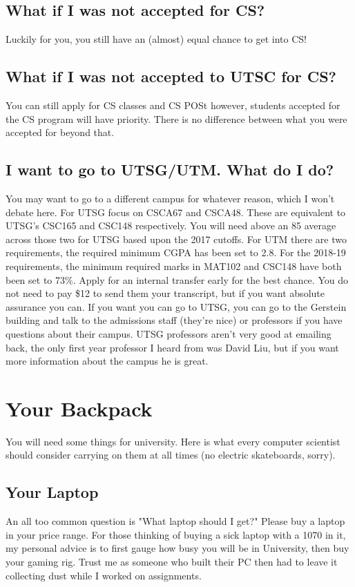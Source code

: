 \documentclass[11pt]{article}
\begin{document}
\subsection{What if I was not accepted for CS?} 
Luckily for you, you still have an (almost) equal chance to get into CS!

\subsection{What if I was not accepted to UTSC for CS?} 
You can still apply for CS classes and CS POSt however, students
accepted for the CS program will have priority. There is no difference
between what you were accepted for beyond that.

\subsection{I want to go to UTSG/UTM\@. What do I do?}
You may want to go to a different campus for whatever reason, which
I won't debate here. For UTSG focus on CSCA67 and CSCA48. These are
equivalent to UTSG's CSC165 and CSC148 respectively. You will need above
an 85 average across those two for UTSG based upon the 2017 cutoffs.
For UTM there are two requirements, the required minimum CGPA has been
set to 2.8. For the 2018-19 requirements, the minimum required marks in
MAT102 and CSC148 have both been set to 73$\%$. Apply for an internal
transfer early for the best chance. You do not need to pay \$12 to send
them your transcript, but if you want absolute assurance you can. If you
want you can go to UTSG, you can go to the Gerstein building and talk to
the admissions staff (they're nice) or professors if you have questions
about their campus. UTSG professors aren't very good at emailing back,
the only first year professor I heard from was David Liu, but if you
want more information about the campus he is great.

\section{Your Backpack}
You will need some things for university. Here is what every computer
scientist should consider carrying on them at all times (no electric
skateboards, sorry).

\subsection{Your Laptop}
An all too common question is "What laptop should I get?" Please buy a
laptop in your price range. For those thinking of buying a sick laptop
with a 1070 in it, my personal advice is to first gauge how busy you
will be in University, then buy your gaming rig. Trust me as someone who
built their PC then had to leave it collecting dust while I worked on
assignments.
\end{document}
